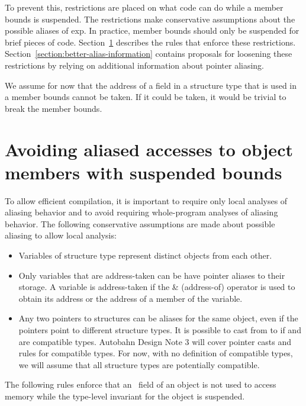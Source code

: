 To prevent this, restrictions are placed on what code can do while a
member bounds is suspended. The restrictions make conservative
assumptions about the possible aliases of exp. In practice, member
bounds should only be suspended for brief pieces of code.
Section~\ref{section:avoiding-aliased-accesses}
describes the rules that enforce these restrictions. 
Section~\ref{section:better-alias-information}
contains proposals for loosening these restrictions by relying on
additional information about pointer aliasing.

We assume for now that the address of a field in a structure type that
is used in a member bounds cannot be taken. If it could be taken, it
would be trivial to break the member bounds.

\section{Avoiding aliased accesses to object members with suspended bounds}\label{section:avoiding-aliased-accesses}

To allow efficient compilation, it is important to require only local
analyses of aliasing behavior and to avoid requiring whole-program
analyses of aliasing behavior. The following conservative assumptions
are made about possible aliasing to allow local analysis:

\begin{itemize}
\item
  Variables of structure type represent distinct objects from each
  other.
\item
  Only variables that are address-taken can be have pointer aliases to
  their storage. A variable is address-taken if the \& (address-of)
  operator is used to obtain its address or the address of a member of
  the variable.
\item
  Any two pointers to structures can be aliases for the same object,
  even if the pointers point to different structure types. It is
  possible to cast from  to
  \ptrT if  and
   are compatible types. Autobahn Design Note 3 will cover
  pointer casts and rules for compatible types. For now, with no
  definition of compatible types, we will assume that all structure
  types are potentially compatible.
\end{itemize}

The following rules enforce that an \arrayptr\ field of an
object is not used to access memory while the type-level invariant for
the object is suspended.

